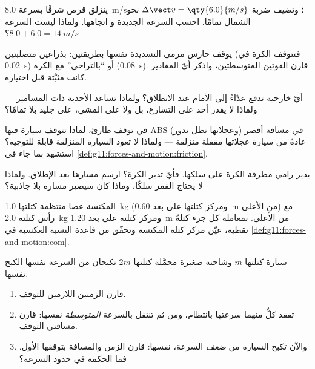 \begin{exercise}[$\star\star$]\label{exo:g11:forces-and-motion:7}
ينزلق قرص شرقًا بسرعة \qty{8.0}{m/s}؛ وتضيف ضربة
$\Delta \vect v = \qty{6.0}{m/s}$ نحو الشمال تمامًا. احسب السرعة الجديدة و
اتجاهها. ولماذا ليست السرعة $8.0 + 6.0 = \qty{14}{m/s}$؟
\end{exercise}

\begin{exercise}[$\star\star$]\label{exo:g11:forces-and-motion:8}
يوقف حارس مرمى التسديدة نفسها بطريقتين: بذراعين متصلبتين (فتتوقف الكرة في
\qty{0.02}{s}) أو ``بالتراخي'' مع الكرة (\qty{0.08}{s}). قارن
القوتين المتوسطتين، واذكر أيّ المقادير كانت مثبَّتة قبل اختياره.
\end{exercise}

\begin{exercise}[$\star\star$]\label{exo:g11:forces-and-motion:9}
أيّ  خارجية تدفع عدّاءً إلى الأمام عند الانطلاق؟ ولماذا تساعد
الأحذية ذات المسامير --- ولماذا لا يقدر أحد على التسارع، بل ولا على المشي، على
جليد بلا  تمامًا؟
\end{exercise}

\begin{exercise}[$\star\star$]\label{exo:g11:forces-and-motion:10}
في توقف طارئ، لماذا تتوقف سيارة فيها ABS (وعجلاتها تظل تدور)
في مسافة أقصر عادةً من سيارة عجلاتها مقفلة منزلقة --- ولماذا
لا تعود السيارة المنزلقة قابلة للتوجيه؟ استشهد
بما جاء في \cref{def:g11:forces-and-motion:friction}.
\end{exercise}

\begin{exercise}[$\star\star$]\label{exo:g11:forces-and-motion:11}
يدير رامي مطرقة الكرةَ على سلكها. فأيّ  تدير
الكرة؟ ارسم مسارها بعد الإطلاق. ولماذا لا يحتاج القمر سلكًا،
وماذا كان سيصير مساره بلا جاذبية؟
\end{exercise}

\begin{exercise}[$\star\star\star$]\label{exo:g11:forces-and-motion:12}
المكنسة عصا منتظمة كتلتها \qty{1.0}{kg} (ومركز كتلتها
على بعد \qty{0.60}{m} من الأعلى) مع رأس كتلته \qty{2.0}{kg} ومركز
كتلته على بعد \qty{1.20}{m} من الأعلى. بمعاملة كل جزء كتلةً نقطية،
عيّن مركز كتلة المكنسة وتحقّق من قاعدة النسبة العكسية في
\cref{def:g11:forces-and-motion:com}.
\end{exercise}

\begin{exercise}[$\star\star\star$]\label{exo:g11:forces-and-motion:13}
سيارة كتلتها $m$ وشاحنة صغيرة محمَّلة كتلتها $2m$ تكبحان من السرعة
نفسها  الكبح نفسها.
\begin{enumerate}
  \item قارن الزمنين اللازمين للتوقف.
  \item تفقد كلٌّ منهما سرعتها بانتظام، ومن ثم تنتقل بالسرعة
        \emph{المتوسطة} نفسها: قارن مسافتي التوقف.
  \item والآن تكبح السيارة من \emph{ضعف} السرعة،  نفسها:
        قارن الزمن والمسافة بتوقفها الأول. فما الحكمة في حدود السرعة؟
\end{enumerate}
\end{exercise}

